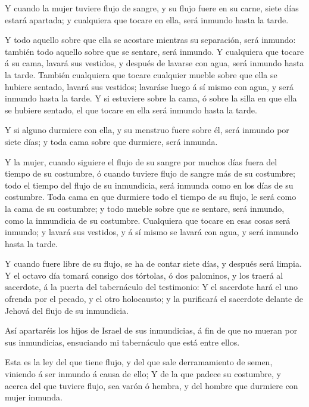 Y cuando la mujer tuviere flujo de sangre, y su flujo
fuere en su carne, siete días estará apartada; y cualquiera que tocare
en ella, será inmundo hasta la tarde.

 Y todo aquello sobre que ella se acostare mientras su
separación, será inmundo: también todo aquello sobre que se sentare,
será inmundo.  Y cualquiera que tocare á su cama, lavará
sus vestidos, y después de lavarse con agua, será inmundo hasta la
tarde.  También cualquiera que tocare cualquier mueble
sobre que ella se hubiere sentado, lavará sus vestidos; lavaráse luego á
sí mismo con agua, y será inmundo hasta la tarde.  Y si
estuviere sobre la cama, ó sobre la silla en que ella se hubiere
sentado, el que tocare en ella será inmundo hasta la tarde.

 Y si alguno durmiere con ella, y su menstruo fuere sobre
él, será inmundo por siete días; y toda cama sobre que durmiere, será
inmunda.

 Y la mujer, cuando siguiere el flujo de su sangre por
muchos días fuera del tiempo de su costumbre, ó cuando tuviere flujo de
sangre más de su costumbre; todo el tiempo del flujo de su inmundicia,
será inmunda como en los días de su costumbre.  Toda cama
en que durmiere todo el tiempo de su flujo, le será como la cama de su
costumbre; y todo mueble sobre que se sentare, será inmundo, como la
inmundicia de su costumbre.  Cualquiera que tocare en esas
cosas será inmundo; y lavará sus vestidos, y á sí mismo se lavará con
agua, y será inmundo hasta la tarde.

 Y cuando fuere libre de su flujo, se ha de contar siete
días, y después será limpia.  Y el octavo día tomará
consigo dos tórtolas, ó dos palominos, y los traerá al sacerdote, á la
puerta del tabernáculo del testimonio:  Y el sacerdote hará
el uno ofrenda por el pecado, y el otro holocausto; y la purificará el
sacerdote delante de Jehová del flujo de su inmundicia.

 Así apartaréis los hijos de Israel de sus inmundicias, á
fin de que no mueran por sus inmundicias, ensuciando mi tabernáculo que
está entre ellos.

 Esta es la ley del que tiene flujo, y del que sale
derramamiento de semen, viniendo á ser inmundo á causa de ello;
 Y de la que padece su costumbre, y acerca del que tuviere
flujo, sea varón ó hembra, y del hombre que durmiere con mujer inmunda.

